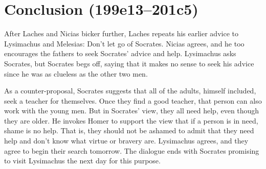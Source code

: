 \documentclass[11pt]{article}
\begin{document}
\section{Conclusion (199e13--201c5)}

After Laches and Nicias bicker further, Laches repeats his earlier advice to Lysimachus and Melesias: Don't let go of Socrates.  Nicias agrees, and he too encourages the fathers to seek Socrates' advice and help.  Lysimachus asks Socrates, but Socrates begs off, saying that it makes no sense to seek his advice since he was as clueless as the other two men.

As a counter-proposal, Socrates suggests that all of the adults, himself included, seek a teacher for themselves.  Once they find a good teacher, that person can also work with the young men.  But in Socrates' view, they all need help, even though they are older.  He invokes Homer to support the view that if a person is in need, shame is no help.  That is, they should not be ashamed to admit that they need help and don't know what virtue or bravery are.  Lysimachus agrees, and they agree to begin their search tomorrow.  The dialogue ends with Socrates promising to visit Lysimachus the next day for this purpose.



\newpage


\end{document}
